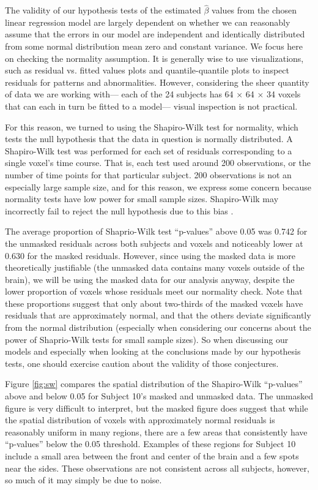\par \indent The validity of our hypothesis tests of the estimated 
$\hat{\beta}$ values from the chosen linear regression model are largely 
dependent on whether we can reasonably assume that the errors in our model 
are independent and identically distributed from some normal distribution 
mean zero and constant variance. We focus here on checking the normality 
assumption. It is generally wise to use visualizations, such as residual vs. 
fitted values plots and quantile-quantile plots to inspect residuals for 
patterns and abnormalities. However, considering the sheer quantity of data 
we are working with--- each of the 24 subjects has 64 $\times$ 64 $\times$ 34 
voxels that can each in turn be fitted to a model--- visual inspection is 
not practical. 

For this reason, we turned to using the Shapiro-Wilk test for normality, 
which tests the null hypothesis that the data in question is normally 
distributed. A Shapiro-Wilk test was performed for each set of residuals 
corresponding to a single voxel's time course. That is, each test used around 
200 observations, or the number of time points for that particular subject. 
200 observations is not an especially large sample size, and for this reason, 
we express some concern because normality tests have low power for small 
sample sizes. Shapiro-Wilk may incorrectly fail to reject the null hypothesis 
due to this bias \cite{ghasemi2012normality}. 

The average proportion of Shaprio-Wilk test ``p-values'' above 0.05 was 0.742 
for the unmasked residuals across both subjects and voxels and noticeably 
lower at 0.630 for the masked residuals. However, since using the masked data 
is more theoretically justifiable (the unmasked data contains many voxels 
outside of the brain), we will be using the masked data for our analysis 
anyway, despite the lower proportion of voxels whose residuals meet our 
normality check. Note that these proportions suggest that only about 
two-thirds of the masked voxels have residuals that are approximately normal, 
and that the others deviate significantly from the normal distribution 
(especially when considering our concerns about the power of Shaprio-Wilk 
tests for small sample sizes). So when discussing our models and especially 
when looking at the conclusions made by our hypothesis tests, one should 
exercise caution about the validity of those conjectures. 

Figure \ref{fig:sw} compares the spatial distribution of the Shapiro-Wilk 
``p-values'' above and below 0.05 for Subject 10's masked and unmasked data. 
The unmasked figure is very difficult to interpret, but the masked figure does 
suggest that while the spatial distribution of voxels with approximately 
normal residuals is reasonably uniform in many regions, there are a few areas 
that consistently have ``p-values'' below the 0.05 threshold. Examples of 
these regions for Subject 10 include a small area between the front and center 
of the brain and a few spots near the sides. These observations are not 
consistent across all subjects, however, so much of it may simply be due to 
noise. 

